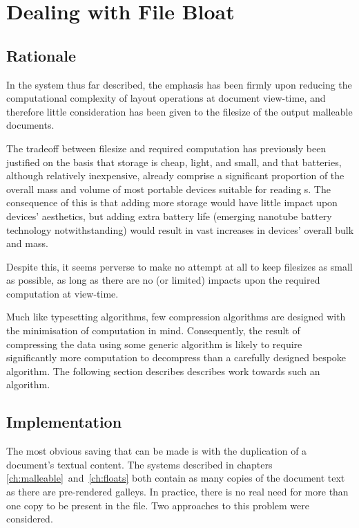 \chapter{Dealing with File Bloat}\label{ch:bloat}

\section{Rationale}
In the system thus far described, the emphasis has been firmly upon reducing the computational complexity of layout operations at document view-time, and therefore little consideration has been given to the filesize of the output malleable documents.


The tradeoff between filesize and required computation has previously been justified on the basis that storage is cheap, light, and small, and that batteries, although relatively inexpensive, already comprise a significant proportion of the overall mass and volume of most portable devices suitable for reading \ebook{}s. The consequence of this is that adding more storage would have little impact upon devices' aesthetics, but adding extra battery life (emerging nanotube battery technology notwithstanding) would result in vast increases in devices' overall bulk and mass.

Despite this, it seems perverse to make no attempt at all to keep filesizes as small as possible, as long as there are no (or limited) impacts upon the required computation at view-time.

Much like typesetting algorithms, few compression algorithms are designed with the minimisation of computation in mind. Consequently, the result of compressing the data using some generic algorithm is likely to require significantly more computation to decompress than a carefully designed bespoke algorithm. The following section describes describes work towards such an algorithm.


\section{Implementation}
The most obvious saving that can be made is with the duplication of a document's textual content. The systems described in chapters \ref{ch:malleable}~and~\ref{ch:floats} both contain as many copies of the document text as there are pre-rendered galleys. In practice, there is no real need for more than one copy to be present in the file. Two approaches to this problem were considered.

